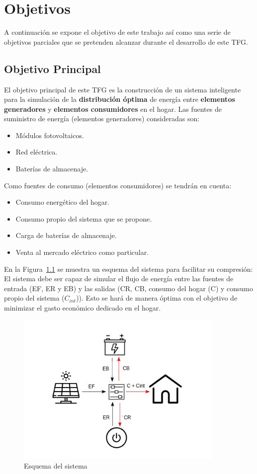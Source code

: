 \chapter{Objetivos}
\label{cap:Objetivo}
A continuación se expone el objetivo de este trabajo así como una serie de objetivos parciales que se pretenden alcanzar durante el desarrollo de este \gls{TFG}.
\section{Objetivo Principal}
El objetivo principal de este \gls{TFG} es la construcción de un sistema inteligente para la simulación de la \textbf{distribución óptima} de energía entre \textbf{elementos generadores} y \textbf{elementos consumidores} en el hogar. Las fuentes de suministro de energía (elementos generadores) consideradas son:
\begin{itemize}
	\item Módulos fotovoltaicos.
	\item Red eléctrica.
	\item Baterías de almacenaje.
\end{itemize}
Como fuentes de consumo (elementos consumidores) se tendrán en cuenta:
\begin{itemize}
	\item Consumo energético del hogar.
	\item Consumo propio del sistema que se propone.
	\item Carga de baterías de almacenaje.
	\item Venta al mercado eléctrico como particular.
\end{itemize}
En la Figura~\ref{fig:schema} se muestra un esquema del sistema para facilitar su compresión: El sistema debe ser capaz de simular el flujo de energía entre las fuentes de entrada (\gls{EF}, \gls{ER} y \gls{EB}) y las salidas (\gls{CR}, \gls{CB}, consumo del hogar (C) y consumo propio del sistema ($ C_{int} $)). Esto se hará de manera óptima con el objetivo de minimizar el gasto económico dedicado en el hogar.

\begin{figure}[H]
	\centering
	\includegraphics[width=10cm]{figs/System.jpg}
	\caption{Esquema del sistema}
        \label{fig:schema}
\end{figure}

